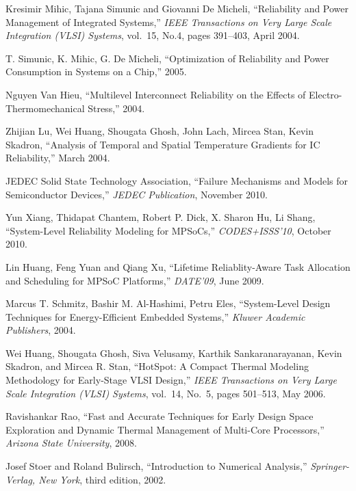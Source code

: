 \begin{thebibliography}{99}
    Kresimir Mihic, Tajana Simunic and Giovanni De Micheli,
    ``Reliability and Power Management of Integrated Systems,''
    \emph{IEEE Transactions on Very Large Scale Integration (VLSI) Systems},
    vol.~15, No.4, pages 391--403, April 2004.

    T. Simunic, K. Mihic, G. De Micheli,
    ``Optimization of Reliability and Power Consumption in Systems on a Chip,''
    2005.

    Nguyen Van Hieu,
    ``Multilevel Interconnect Reliability on the Effects of Electro-Thermomechanical Stress,''
    2004.

    Zhijian Lu, Wei Huang, Shougata Ghosh, John Lach, Mircea Stan, Kevin Skadron,
    ``Analysis of Temporal and Spatial Temperature Gradients for IC Reliability,''
    March 2004.

    JEDEC Solid State Technology Association,
    ``Failure Mechanisms and Models for Semiconductor Devices,''
    \emph{JEDEC Publication},
    November 2010.

    Yun Xiang, Thidapat Chantem, Robert P. Dick, X. Sharon Hu, Li Shang,
    ``System-Level Reliability Modeling for MPSoCs,''
    \emph{CODES+ISSS'10},
    October 2010.

    Lin Huang, Feng Yuan and Qiang Xu,
    ``Lifetime Reliablity-Aware Task Allocation and Scheduling for MPSoC Platforms,''
    \emph{DATE'09},
    June 2009.

    Marcus T. Schmitz, Bashir M. Al-Hashimi, Petru Eles,
    ``System-Level Design Techniques for Energy-Efficient Embedded Systems,''
    \emph{Kluwer Academic Publishers},
    2004.

    Wei Huang, Shougata Ghosh, Siva Velusamy, Karthik Sankaranarayanan, Kevin Skadron, and Mircea R. Stan,
    ``HotSpot: A Compact Thermal Modeling Methodology for Early-Stage VLSI Design,''
    \emph{IEEE Transactions on Very Large Scale Integration (VLSI) Systems},
    vol.~14, No.~5, pages 501--513, May 2006.

    Ravishankar Rao,
    ``Fast and Accurate Techniques for Early Design Space Exploration and Dynamic Thermal Management of Multi-Core Processors,''
    \emph{Arizona State University},
    2008.

    Josef Stoer and Roland Bulirsch,
    ``Introduction to Numerical Analysis,''
    \emph{Springer-Verlag, New York},
    third edition, 2002.


\end{thebibliography}
